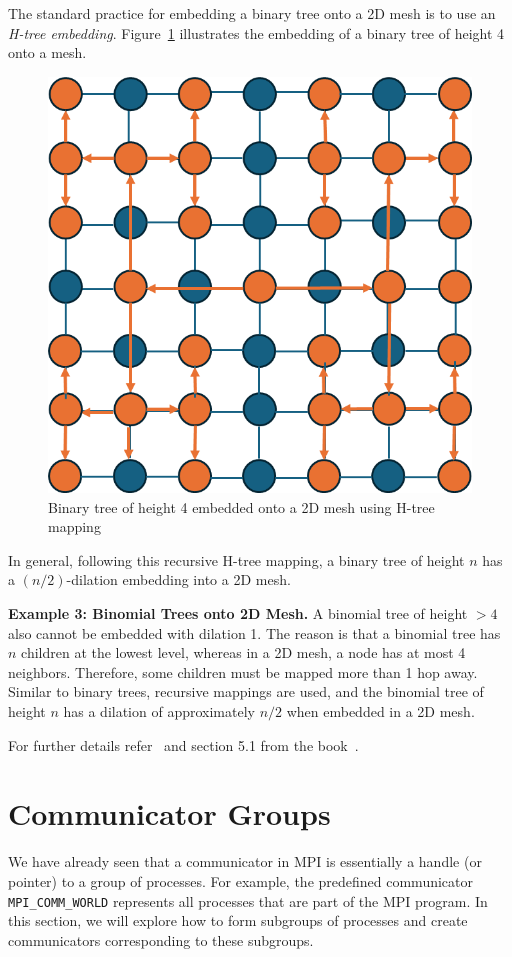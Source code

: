 \documentclass[12pt]{book}
\begin{document}
The standard practice for embedding a binary tree onto a 2D mesh is to use an \textit{H-tree embedding}. Figure~\ref{fig:treemesh} illustrates the embedding of a binary tree of height 4 onto a mesh.

\begin{figure}[ht]
    \centering
    \includegraphics[width=0.5\linewidth]{images/btreemesh.png}
    \caption{Binary tree of height 4 embedded onto a 2D mesh using H-tree mapping}
    \label{fig:treemesh}
\end{figure}

In general, following this recursive H-tree mapping, a binary tree of height $n$ has a $(n/2)$-dilation embedding into a 2D mesh.

\medskip
\textbf{Example 3: Binomial Trees onto 2D Mesh.}  
A binomial tree of height $>4$ also cannot be embedded with dilation 1. The reason is that a binomial tree has $n$ children at the lowest level, whereas in a 2D mesh, a node has at most 4 neighbors. Therefore, some children must be mapped more than 1 hop away. Similar to binary trees, recursive mappings are used, and the binomial tree of height $n$ has a dilation of approximately $n/2$ when embedded in a 2D mesh.


For further details refer~\cite{thakur2005optimization, thakur2003improving} and section 5.1 from the book~\cite{quinn1994parallel}.


\section{Communicator Groups}

We have already seen that a communicator in MPI is essentially a handle (or pointer) to a group of processes. For example, the predefined communicator \texttt{MPI\_COMM\_WORLD} represents all processes that are part of the MPI program. In this section, we will explore how to form subgroups of processes and create communicators corresponding to these subgroups.
\end{document}
